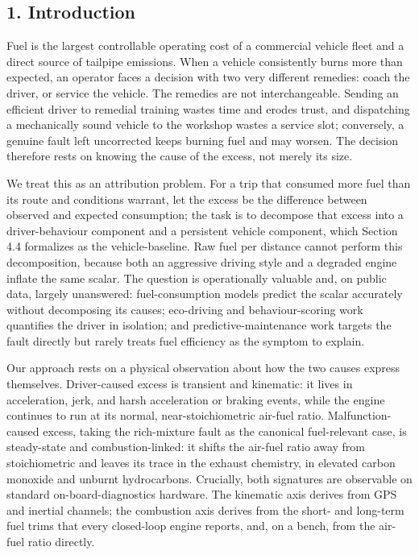 \subsection{1. Introduction}\label{intro}

Fuel is the largest controllable operating cost of a commercial vehicle
fleet and a direct source of tailpipe emissions. When a vehicle
consistently burns more than expected, an operator faces a decision with
two very different remedies: coach the driver, or service the vehicle.
The remedies are not interchangeable. Sending an efficient driver to
remedial training wastes time and erodes trust, and dispatching a
mechanically sound vehicle to the workshop wastes a service slot;
conversely, a genuine fault left uncorrected keeps burning fuel and may
worsen. The decision therefore rests on knowing the cause of the excess,
not merely its size.

We treat this as an attribution problem. For a trip that consumed more
fuel than its route and conditions warrant, let the excess be the
difference between observed and expected consumption; the task is to
decompose that excess into a driver-behaviour component and a persistent
vehicle component, which Section 4.4 formalizes as the vehicle-baseline.
Raw fuel per distance cannot perform this decomposition, because both an
aggressive driving style and a degraded engine inflate the same scalar.
The question is operationally valuable and, on public data, largely
unanswered: fuel-consumption models predict the scalar accurately
without decomposing its causes; eco-driving and behaviour-scoring work
quantifies the driver in isolation; and predictive-maintenance work
targets the fault directly but rarely treats fuel efficiency as the
symptom to explain.

Our approach rests on a physical observation about how the two causes
express themselves. Driver-caused excess is transient and kinematic: it
lives in acceleration, jerk, and harsh acceleration or braking events,
while the engine continues to run at its normal, near-stoichiometric
air-fuel ratio. Malfunction-caused excess, taking the rich-mixture fault
as the canonical fuel-relevant case, is steady-state and
combustion-linked: it shifts the air-fuel ratio away from stoichiometric
and leaves its trace in the exhaust chemistry, in elevated carbon
monoxide and unburnt hydrocarbons. Crucially, both signatures are
observable on standard on-board-diagnostics hardware. The kinematic axis
derives from GPS and inertial channels; the combustion axis derives from
the short- and long-term fuel trims that every closed-loop engine
reports, and, on a bench, from the air-fuel ratio directly.


